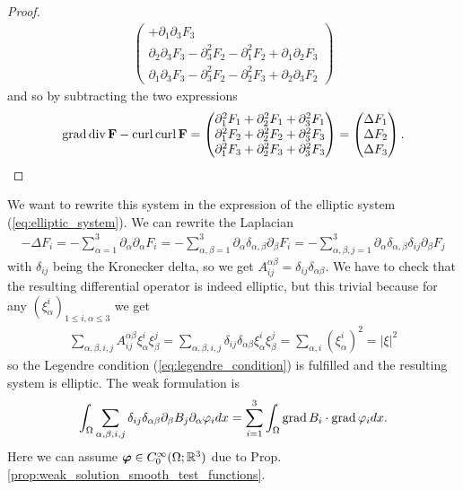 \documentclass[../main.tex]{subfiles}
\begin{document}
\begin{proof}
\begin{align*}
\begin{pmatrix}
            + \partial_1 \partial_3 F_3 
            \\ \partial_2 \partial_3 F_3 - \partial^2_3 F_2 - \partial_1^2 F_2
            + \partial_1 \partial_2 F_3
            \\ \partial_1 \partial_3 F_3 - \partial^2_3 F_2 - \partial_2^2 F_3
            + \partial_2 \partial_3 F_2  
            \end{pmatrix}
    \end{align*}
    and so by subtracting the two expressions
    \begin{align*}
        \operatorname{grad} \operatorname{div} \mathbf{F} - \operatorname{curl} \operatorname{curl} \mathbf{F}  
        = \begin{pmatrix}
            \partial_1^2 F_1 + \partial_2^2 F_1 + \partial_3^2 F_1
            \\ \partial_1^2 F_2 + \partial_2^2 F_2 + \partial_3^2 F_3
            \\ \partial_1^2 F_3 + \partial_2^2 F_3 + \partial_3^2 F_3
        \end{pmatrix}
        = \begin{pmatrix}
            \Delta F_1 \\ \Delta F_2 \\ \Delta F_3
        \end{pmatrix}.
    \end{align*}
\end{proof}
We want to rewrite this system in the expression of the elliptic system 
(\ref{eq:elliptic_system}). We can rewrite the Laplacian
\begin{align*}
    - \Delta F_i = - \sum\limits_{\alpha = 1}^3 
        \partial_\alpha \partial_\alpha F_i
    = - \sum\limits_{\alpha,\beta = 1}^3 
    \partial_\alpha \delta_{\alpha,\beta} \partial_\beta F_i
    = - \sum\limits_{\alpha,\beta,j = 1}^3 
    \partial_\alpha \delta_{\alpha,\beta} \delta_{ij} \partial_\beta F_j
\end{align*}
with $\delta_{ij}$ being the Kronecker delta, 
so we get $A_{ij}^{\alpha\beta} = \delta_{ij} \delta_{\alpha \beta}$.
We have to check that the resulting differential operator is indeed
elliptic, but this trivial because for any 
$(\xi_\alpha^i)_{1\leq i,\alpha \leq 3}$
we get 
\begin{align*}
    \sum\limits_{\alpha,\beta,i,j} A_{ij}^{\alpha\beta} \xi_\alpha^i \xi_\beta^j 
    = \sum\limits_{\alpha,\beta,i,j} \delta_{ij} \delta_{\alpha \beta} 
        \xi_\alpha^i \xi_\beta^j 
    = \sum\limits_{\alpha,i} (\xi_\alpha^i)^2 = |\xi|^2
\end{align*}
so  the Legendre condition (\ref{eq:legendre_condition}) 
is fulfilled and the resulting system is elliptic. The weak formulation 
is 
\begin{align*}
    \int_\Omega \sum\limits_{\alpha,\beta,i,j} \delta_{ij} \delta_{\alpha\beta}
        \partial_\beta B_j \partial_\alpha \varphi_i dx 
    = \sum\limits_{i=1}^3 \int_\Omega \operatorname{grad} B_i \cdot \operatorname{grad} \varphi_i dx.
\end{align*}
Here we can assume $\bm{\varphi} \in C_0^\infty (\Omega;\mathbb{R}^3)$
due to Prop.\,\ref{prop:weak_solution_smooth_test_functions}.
\end{document}

